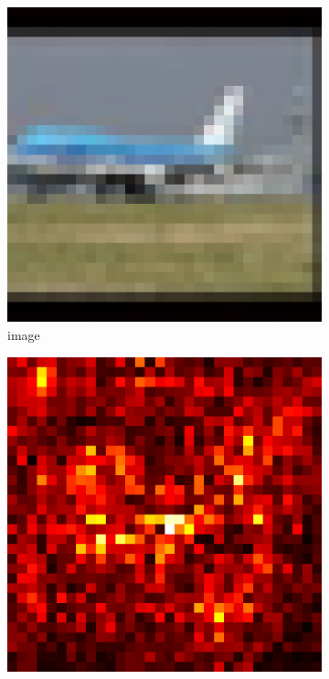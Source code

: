 \documentclass[preprint,12pt]{elsarticle}
\begin{document}
\begin{figure}
    \centering
    \begin{subfigure}{0.14\linewidth}
        \centering
        \includegraphics[width=\linewidth]{../visualizations/examples/cifar10/resnet18/images/0.png}
        \caption{image}
    \end{subfigure}
    \hfill
    \begin{subfigure}{0.14\linewidth}
        \centering
        \includegraphics[width=\linewidth]{../visualizations/examples/cifar10/resnet18/saliency_map/0.png}

\end{subfigure}
\end{figure}
\end{document}
